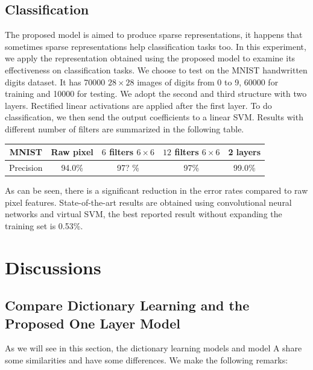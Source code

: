 \documentclass[a4paper]{article}
\begin{document}
\subsection{Classification}
The proposed model is aimed to produce sparse representations, it happens that sometimes sparse representations help classification tasks too. In this experiment, we apply the representation obtained using the proposed model to examine its effectiveness on classification tasks. We choose to test on the MNIST handwritten digits dataset. It has 70000 $28\times 28$ images of digits from 0 to 9, 60000 for training and 10000 for testing. We adopt the second and third structure with two layers. Rectified linear activations are applied after the first layer. To do classification, we then send the output coefficients to a linear SVM.  Results with different number of filters are summarized in the following table.
\begin{center}
\begin{tabular}{|c |c |c |c |c|}
\hline
MNIST & Raw pixel & $6$ filters $6\times 6$ & $12$ filters $6\times 6$& 2 layers \\
\hline
Precision & 94.0\% & 97? \% & 97\% & 99.0\% \\
\hline
\end{tabular}
\end{center}
As can be seen, there is a significant reduction in the error rates compared to raw pixel features. State-of-the-art results are obtained using convolutional neural networks and virtual SVM, the best reported result without expanding the training set is 0.53\%.

\section{Discussions}
\subsection{Compare Dictionary Learning and the Proposed One Layer Model}
As we will see in this section, the dictionary learning models and model A share some similarities and have some differences. We make the following remarks: 
\end{document}
